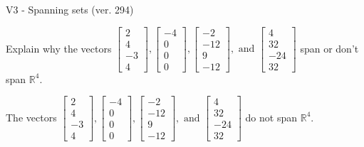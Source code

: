 \begin{exercise}
  \begin{exerciseTitle}V3 - Spanning sets (ver. 294)\end{exerciseTitle}
  \begin{exerciseStatement}
    Explain why the vectors \(\left[\begin{array}{r}
2 \\
4 \\
-3 \\
4
\end{array}\right] , \left[\begin{array}{r}
-4 \\
0 \\
0 \\
0
\end{array}\right] , \left[\begin{array}{r}
-2 \\
-12 \\
9 \\
-12
\end{array}\right] , \text{ and } \left[\begin{array}{r}
4 \\
32 \\
-24 \\
32
\end{array}\right]\) span or don't span \(\mathbb{R}^4\). 
	


  \end{exerciseStatement}
  \begin{exerciseAnswer}
   The vectors \(\left[\begin{array}{r}
2 \\
4 \\
-3 \\
4
\end{array}\right] , \left[\begin{array}{r}
-4 \\
0 \\
0 \\
0
\end{array}\right] , \left[\begin{array}{r}
-2 \\
-12 \\
9 \\
-12
\end{array}\right] , \text{ and } \left[\begin{array}{r}
4 \\
32 \\
-24 \\
32
\end{array}\right]\) 
  	 do not  
	span \(\mathbb{R}^4\).
  


  \end{exerciseAnswer}
\end{exercise}